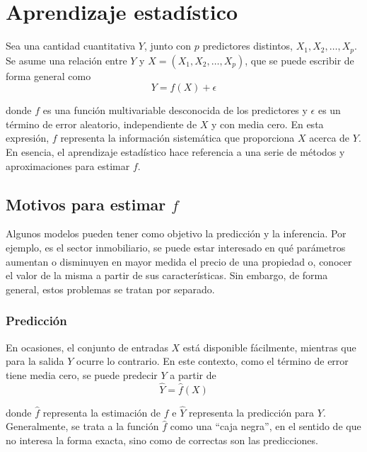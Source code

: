 \chapter{Aprendizaje estadístico}\label{Chapter1} 

Sea una cantidad cuantitativa $Y$, junto con $p$ predictores distintos, $X_1, X_2, \dots, X_p$. Se asume una relación entre $Y$ y $X = (X_1, X_2, \dots, X_p)$, que se puede escribir de forma general como 
\begin{equation}
Y = f(X) + \epsilon
\end{equation}  

\noindent donde $f$ es una función multivariable desconocida de los predictores y $\epsilon$ es un término de error aleatorio, independiente de $X$ y con media cero. En esta expresión, $f$ representa la información sistemática que proporciona $X$ acerca de $Y$. \\

En esencia, el aprendizaje estadístico hace referencia a una serie de métodos y aproximaciones para estimar $f$.

\section{Motivos para estimar $f$}

Algunos modelos pueden tener como objetivo la predicción y la inferencia. Por ejemplo, es el sector inmobiliario, se puede estar interesado en qué parámetros aumentan o disminuyen en mayor medida el precio de una propiedad o, conocer el valor de la misma a partir de sus características. Sin embargo, de forma general, estos problemas se tratan por separado. 

\subsection{Predicción}

En ocasiones, el conjunto de entradas $X$ está disponible fácilmente, mientras que para la salida $Y$ ocurre lo contrario. En este contexto, como el término de error tiene media cero, se puede predecir $Y$ a partir de 
\begin{equation}
\hat{Y} = \hat{f}(X)
\end{equation}

\noindent donde $\hat{f}$ representa la estimación de $f$ e $\hat{Y}$ representa la predicción para $Y$. Generalmente, se trata a la función $\hat{f}$ como una ``caja negra'', en el sentido de que no interesa la forma exacta, sino como de correctas son las predicciones. \\

